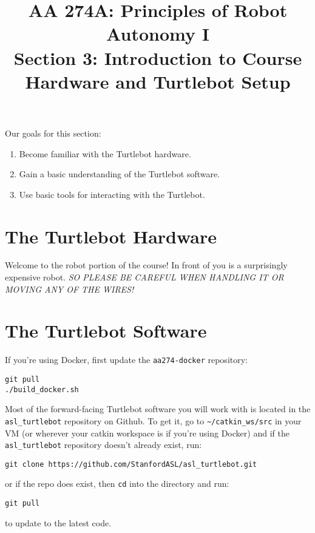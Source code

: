 \documentclass{article}
\title{AA 274A: Principles of Robot Autonomy I \\ Section 3: Introduction to Course Hardware and Turtlebot Setup}
\date{}
\begin{document}
\maketitle
\pagestyle{fancy}

Our goals for this section: \begin{enumerate}
	\item Become familiar with the Turtlebot hardware.
	\item Gain a basic understanding of the Turtlebot software.
	\item Use basic tools for interacting with the Turtlebot.
\end{enumerate}

\section{The Turtlebot Hardware}

Welcome to the robot portion of the course! In front of you is a surprisingly expensive robot. \textit{SO PLEASE BE CAREFUL WHEN HANDLING IT OR MOVING ANY OF THE WIRES!}

\section{The Turtlebot Software}

If you're using Docker, first update the \texttt{aa274-docker} repository:

\begin{lstlisting}
git pull
./build_docker.sh
\end{lstlisting}

Most of the forward-facing Turtlebot software you will work with is located in the \texttt{asl\_turtlebot} repository on Github. To get it, go to \texttt{\textasciitilde/catkin\_ws/src} in your VM (or wherever your catkin workspace is if you're using Docker) and if the \texttt{asl\_turtlebot} repository doesn't already exist, run:

\begin{lstlisting}
git clone https://github.com/StanfordASL/asl_turtlebot.git
\end{lstlisting}

or if the repo does exist, then \texttt{cd} into the directory and run:

\begin{lstlisting}
git pull
\end{lstlisting}

to update to the latest code.
\end{document}

